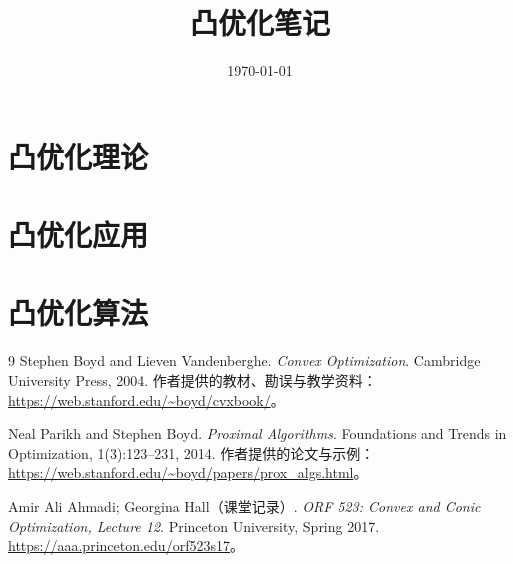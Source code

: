\documentclass[UTF8,12pt,a4paper,fontset=fandol]{ctexbook}
\title{凸优化笔记}
\author{}
\date{\today}
\begin{document}
\frontmatter %


\maketitle
\tableofcontents
\clearpage


\mainmatter


\part{凸优化理论}





\part{凸优化应用}




\part{凸优化算法}




\appendix




\begin{thebibliography}{9}
Stephen Boyd and Lieven Vandenberghe.
\textit{Convex Optimization}. Cambridge University Press, 2004.
作者提供的教材、勘误与教学资料：\url{https://web.stanford.edu/~boyd/cvxbook/}。

Neal Parikh and Stephen Boyd.
\textit{Proximal Algorithms}.
Foundations and Trends in Optimization, 1(3):123--231, 2014.
作者提供的论文与示例：\url{https://web.stanford.edu/~boyd/papers/prox_algs.html}。

Amir Ali Ahmadi; Georgina Hall（课堂记录）.
\textit{ORF 523: Convex and Conic Optimization, Lecture 12}.
Princeton University, Spring 2017.
\url{https://aaa.princeton.edu/orf523s17}。
\end{thebibliography}
\end{document}
